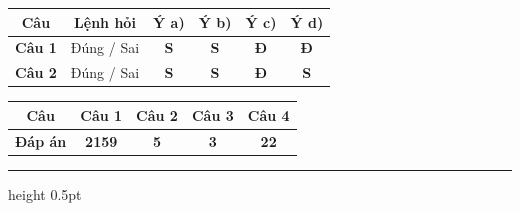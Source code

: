 \documentclass[11pt,a4paper]{article}
\begin{document}
\vspace{3pt}
\begin{center}
\renewcommand{\arraystretch}{1.2}
\begin{tabular}{|c|c|c|c|c|c|}
\hline
\rowcolor{tableGreen}
\textbf{Câu} & \textbf{Lệnh hỏi} & \textbf{Ý a)} & \textbf{Ý b)} & \textbf{Ý c)} & \textbf{Ý d)} \\
\hline
\textbf{Câu 1} & Đúng / Sai & \textbf{S} & \textbf{S} & \textbf{\color{hfRed}Đ} & \textbf{\color{hfRed}Đ} \\
\hline
\textbf{Câu 2} & Đúng / Sai & \textbf{S} & \textbf{S} & \textbf{\color{hfRed}Đ} & \textbf{S} \\
\hline
\end{tabular}
\end{center}

\vspace{3pt}
\begin{center}
\renewcommand{\arraystretch}{1.2}
\begin{tabular}{|c|c|c|c|c|}
\hline
\rowcolor{tableGreen}
\textbf{Câu} & \textbf{Câu 1} & \textbf{Câu 2} & \textbf{Câu 3} & \textbf{Câu 4} \\
\hline
\textbf{Đáp án} & \textbf{\color{hfRed}2159} & \textbf{\color{hfRed}5} & \textbf{\color{hfRed}3} & \textbf{\color{hfRed}22} \\
\hline
\end{tabular}
\end{center}
\vspace{6pt}
\hrule height 0.5pt
\vspace{6pt}

\vspace{4pt}
\end{document}
